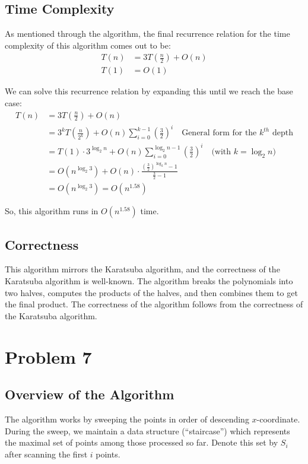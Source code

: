 \documentclass[a4paper]{article}
\begin{document}
\subsection*{Time Complexity}
\noindent As mentioned through the algorithm, the final recurrence relation for the time complexity of this algorithm comes out to be:
\begin{align*}
    T(n) &= 3T\left(\frac{n}{2}\right) + O(n) \\
    T(1) &= O(1)
\end{align*}

\noindent We can solve this recurrence relation by expanding this until we reach the base case:
\begin{align*}
    T(n) &= 3T\left(\frac{n}{2}\right) + O(n) \\
            &= 3^k T\left(\frac{n}{2^k}\right) + O(n) \sum_{i=0}^{k-1} \left(\frac{3}{2}\right)^i \quad \text {General form for the } k^{th} \text{ depth}\\
            &= T(1) \cdot 3^{\log_2 n} + O(n) \sum_{i=0}^{\log_2 n - 1} \left(\frac{3}{2}\right)^i \quad \text{(with } k=\log_2 n\text{)} \\
            &= O\left(n^{\log_2 3}\right) + O(n) \cdot \frac{\left(\frac{3}{2}\right)^{\log_2 n}-1}{\frac{3}{2}-1} \\
            &= O\left(n^{\log_2 3}\right) = O(n^{1.58})
\end{align*}

So, this algorithm runs in $O(n^{1.58})$ time.

\vspace{0.5em}
\subsection*{Correctness}
This algorithm mirrors the Karatsuba algorithm, and the correctness of the Karatsuba algorithm is well-known. The algorithm breaks the polynomials into two halves, computes the products of the halves, and then combines them to get the final product. The correctness of the algorithm follows from the correctness of the Karatsuba algorithm.

\newpage
\section*{Problem 7}
\subsection*{Overview of the Algorithm}
The algorithm works by sweeping the points in order of descending $x$-coordinate. During the sweep, we maintain a data structure (\enquote{staircase}) which represents the maximal set of points among those processed so far. Denote this set by $S_i$ after scanning the first $i$ points. \\
\end{document}
